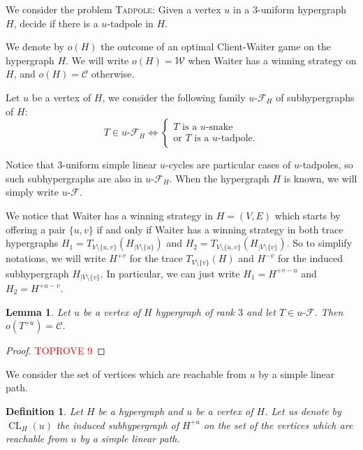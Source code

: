 \documentclass{article}
\DeclareMathOperator{\CL}{CL}
\newcommand{\Client}{\mathcal{C}}
\newcommand{\Waiter}{\mathcal{W}}
\newcommand{\uCwin}{u\text{-}\mathcal{F}}
\newtheorem{lemma}[theorem]{Lemma}
\newtheorem{definition}[theorem]{Definition}
\begin{document}
We consider the problem \textsc{Tadpole}: Given a vertex \(u\) in a \(3\)-uniform hypergraph \(H\), decide if there is a \(u\)-tadpole in \(H\).

We denote by \(o(H)\) the outcome of an optimal Client-Waiter game on the hypergraph \(H\). We will write \(o(H)= \Waiter\) when Waiter has a winning strategy on \(H\), and \(o(H) = \Client\) otherwise.


















Let \(u\) be a vertex of \(H\), we consider the following family \(\uCwin_H\) of subhypergraphs of \(H\):
\[
	T \in \uCwin_H \iff \begin{cases}
T \text{ is a } u\text{-snake} \\
			\text{or } T \text{ is a } u\text{-tadpole}.
		\end{cases}
\]

Notice that \(3\)-uniform simple linear \(u\)-cycles are particular cases of \(u\)-tadpoles, so such subhypergraphs are also in \(\uCwin_H\). When the hypergraph \(H\) is known, we will simply write \(\uCwin\).

We notice that Waiter has a winning strategy in \(H=(V,E)\) which starts by offering a pair \(\{u,v\}\) if and only if Waiter has a winning strategy in both trace hypergraphs \(H_1 = T_{V \setminus \{u,v\}}(H_{| V \setminus \{u\}})\) and \(H_2 = T_{V \setminus \{u,v\}}(H_{| V \setminus \{v\}})\). So to simplify notations, we will write \(H^{+v}\) for the trace \(T_{V\setminus\{v\}}(H)\) and \(H^{-v}\) for the induced subhypergraph \(H_{|V\setminus \{v\}}\). In particular, we can just write \(H_1 = H^{+v-u}\) and \(H_2 = H^{+u-v}\).







\begin{lemma}\label{lem:gTadpoleCwin}
	Let \(u\) be a vertex of \(H\) hypergraph of rank \(3\) and let \(T \in \uCwin\). Then \(o(T^{+u}) = \Client\).
\end{lemma}

\begin{proof}\textcolor{red}{TOPROVE 9}\end{proof}

We consider the set of vertices which are reachable from \(u\) by a simple linear path.
\begin{definition}
	Let \(H\) be a hypergraph and \(u\) be a vertex of \(H\). Let us denote by \(\CL_H(u)\) the induced subhypergraph of \(H^{+u}\) on the set of the vertices which are reachable from \(u\) by a simple linear path.
\end{definition}
\end{document}
